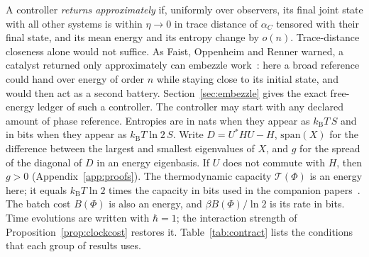 \documentclass[11pt]{article}
\theoremstyle{definition}
\theoremstyle{remark}
\newcommand{\kB}{k_{\mathrm B}}
\begin{document}
A controller \emph{returns approximately} if, uniformly over observers, its final joint state with all other systems is within $\eta\to0$ in trace distance of $\alpha_C$ tensored with their final state, and its mean energy and its entropy change by $o(n)$. Trace-distance closeness alone would not suffice. As Faist, Oppenheim and Renner warned, a catalyst returned only approximately can embezzle work~\cite{FOR15}: here a broad reference could hand over energy of order $n$ while staying close to its initial state, and would then act as a second battery. Section~\ref{sec:embezzle} gives the exact free-energy ledger of such a controller. The controller may start with any declared amount of phase reference. Entropies are in nats when they appear as $\kB T\,S$ and in bits when they appear as $\kB T\ln2\,S$. Write $D=U^*HU-H$, $\mathrm{span}(X)$ for the difference between the largest and smallest eigenvalues of $X$, and $g$ for the spread of the diagonal of $D$ in an energy eigenbasis. If $U$ does not commute with $H$, then $g>0$ (Appendix~\ref{app:proofs}). The thermodynamic capacity $\mathcal T(\Phi)$ is an energy here; it equals $\kB T\ln2$ times the capacity in bits used in the companion papers~\cite{SaveWork,TimeOrder}. The batch cost $B(\Phi)$ is also an energy, and $\beta B(\Phi)/\ln2$ is its rate in bits. Time evolutions are written with $\hbar=1$; the interaction strength of Proposition~\ref{prop:clockcost} restores it. Table~\ref{tab:contract} lists the conditions that each group of results uses.
\end{document}
